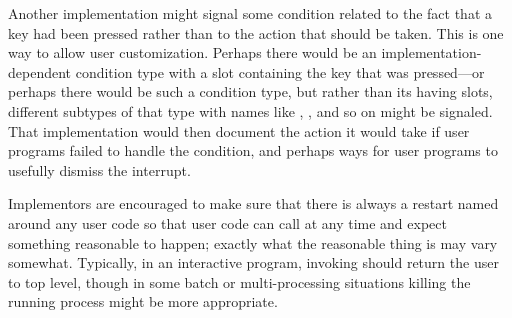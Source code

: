 \begin{defmac}
\begin{sideremark}
Another implementation might signal some condition related to the fact that a
key had been pressed rather than to the action that should be taken. This is one
way to allow user customization.  Perhaps there would be an
implementation-dependent  condition type with a slot
containing the key that was pressed---or perhaps there would be such a condition
type, but rather than its having slots, different subtypes of that type with
names like , , and so on might be
signaled. That implementation would then document the action it would take if
user programs failed to handle the condition, and perhaps ways for user programs
to usefully dismiss the interrupt.
\end{sideremark}
\betweennoterule
\begin{implementation}
Implementors are encouraged to make sure that there is always a restart named
 around any user code so that user code  can call  at any
time and expect something reasonable to happen; exactly what the reasonable
thing is may vary somewhat. Typically, in an interactive program, invoking
 should return the user to top level, though in some batch or
multi-processing situations killing the running process might be more
appropriate.
\end{implementation}
\afternoterule
\end{defmac}

